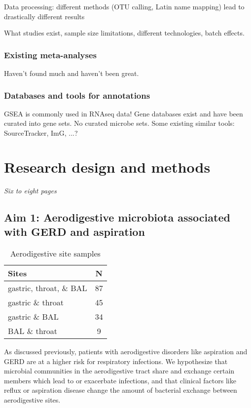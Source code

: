\documentclass[12pt]{article}
\begin{document}
Data processing: different methods (OTU calling, Latin name mapping) lead to drastically different results

What studies exist, sample size limitations, different technologies, batch effects.

\subsubsection{Existing meta-analyses}
Haven't found much and haven't been great.

\subsubsection{Databases and tools for annotations}
GSEA is commonly used in RNAseq data! Gene databases exist and have been curated into gene sets.
No curated microbe sets. Some existing similar tools: SourceTracker, ImG, ...?

\section{Research design and methods}
\textit{Six to eight pages}

\subsection{Aim 1: Aerodigestive microbiota associated with GERD and aspiration}

\begin{wraptable}{r}{5.5cm}
\begin{tabular}{|l|c|}
	\hline
	\textbf{Sites} & \textbf{N} \\
	\hline
	gastric, throat, \& BAL & 87 \\
	gastric \& throat & 45 \\
	gastric \& BAL & 34 \\
	BAL \& throat & 9 \\
	\hline 
\end{tabular}
\caption{Aerodigestive site samples}\label{tab:rosen_samples}
\end{wraptable}

As discussed previously, patients with aerodigestive disorders like aspiration and GERD are at a higher risk for respiratory infections. We hypothesize that microbial communities in the aerodigestive tract share and exchange certain members which lead to or exacerbate infections, and that clinical factors like reflux or aspiration disease change the amount of bacterial exchange between aerodigestive sites.
\end{document}
